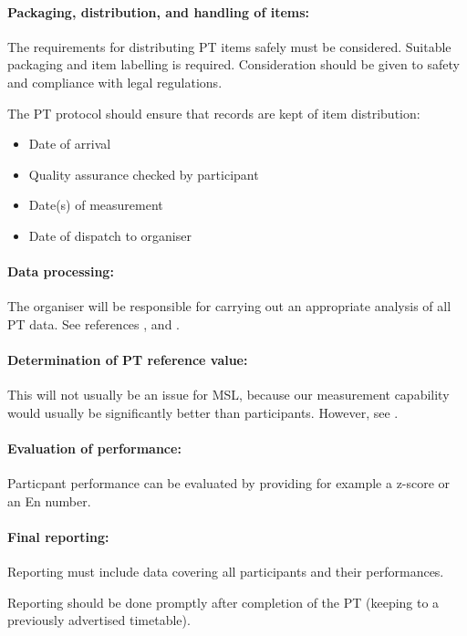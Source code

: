 \paragraph{Packaging, distribution, and handling of items:}
The requirements for distributing PT items safely must be considered. Suitable packaging and item labelling is required. Consideration should be given to safety and compliance with legal regulations. 

The PT protocol should ensure that records are kept of item distribution: 
\begin{itemize}
	\item Date of arrival
	\item Quality assurance checked by participant
	\item Date(s) of measurement
	\item Date of dispatch to organiser
\end{itemize}
 
\paragraph{Data processing:}
The organiser will be responsible for carrying out an appropriate analysis of all PT data. See references \cite{Milde:2020}, \cite{BSI:repeatability} and \cite{BSI:proficiency}.

\paragraph{Determination of PT reference value:}
This will not usually be an issue for MSL, because our measurement capability would usually be significantly better than participants. However, see \cite{Milde:2020}.
 
\paragraph{Evaluation of performance:}
Particpant performance can be evaluated by providing for example a z-score or an En number.

\paragraph{Final reporting:}
Reporting must include data covering all participants and their performances. 

Reporting should be done promptly after completion of the PT (keeping to a previously advertised timetable).

